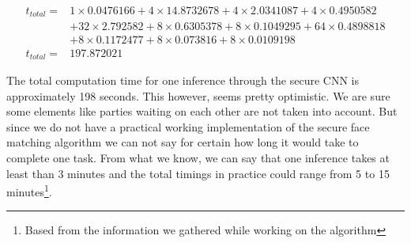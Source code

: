 \begin{equation} \label{eq:comp_time}
  \begin{aligned}
      t_{total} = & 1\times0.0476166 + 4\times14.8732678 + 4\times2.0341087 + 4\times0.4950582\\
                & + 32\times2.792582 + 8\times0.6305378 + 8\times0.1049295 + 64\times0.4898818\\
                & + 8\times0.1172477 + 8\times0.073816 + 8\times 0.0109198\\
      t_{total} = & 197.872021
  \end{aligned}
\end{equation}

The total computation time for one inference through the secure CNN is approximately 198 seconds. This however, seems pretty optimistic. We are sure some elements like parties waiting on each other are not taken into account. But since we do not have a practical working implementation of the secure face matching algorithm we can not say for certain how long it would take to complete one task. From what we know, we can say that one inference takes at least than 3 minutes and the total timings in practice could range from 5 to 15 minutes\footnote{Based from the information we gathered while working on the algorithm}.
